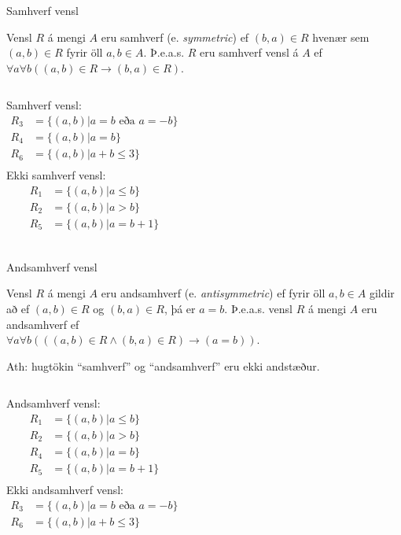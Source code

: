 \documentclass[handout]{beamer}
\begin{document}
\begin{frame}{Samhverf vensl}
\begin{tcolorbox}[title=Samhverf vensl]
Vensl $R$ á mengi $A$ eru samhverf (e. \emph{symmetric}) ef $(b, a) \in R$ hvenær sem $(a,b) \in R$ fyrir öll $a,b \in A$. Þ.e.a.s. $R$ eru samhverf vensl á $A$ ef $\forall a \forall b ((a,b) \in R \to (b, a) \in R)$.
\end{tcolorbox}
\vspace{0.5cm}
\begin{columns}
Samhverf vensl:
\begin{align*}
R_3 &= \{(a, b)|a = b \text{ eða } a = -b\}\\
R_4 &= \{(a, b)|a = b\}\\
R_6 &= \{(a, b)|a+b \leq 3\}\\
\end{align*}
Ekki samhverf vensl:
\begin{align*}
R_1 &= \{(a, b)|a \leq b\}\\
R_2 &= \{(a, b)|a > b\}\\
R_5 &= \{(a, b)|a = b+1\}\\
\end{align*}
\end{columns}
\end{frame}

\begin{frame}[fragile]{Andsamhverf vensl}
\begin{tcolorbox}[title=Andsamhverf vensl]
Vensl $R$ á mengi $A$ eru andsamhverf (e. \emph{antisymmetric}) ef fyrir öll $a, b \in A$ gildir að ef $(a, b) \in R$ og $(b, a) \in R$, þá er $a=b$. Þ.e.a.s. vensl $R$ á mengi $A$ eru andsamhverf ef\\ $\forall a \forall b (((a, b) \in R \land (b, a) \in R) \to (a = b))$.
\end{tcolorbox}
Ath: hugtökin ``samhverf'' og ``andsamhverf'' eru ekki andstæður.
\begin{columns}
Andsamhverf vensl:
\begin{align*}
R_1 &= \{(a, b)|a \leq b\}\\
R_2 &= \{(a, b)|a > b\}\\
R_4 &= \{(a, b)|a = b\}\\
R_5 &= \{(a, b)|a = b+1\}\\
\end{align*}
Ekki andsamhverf vensl:
\begin{align*}
R_3 &= \{(a, b)|a = b \text{ eða } a = -b\}\\
R_6 &= \{(a, b)|a+b \leq 3\}\\
\end{align*}
\end{columns}
\end{frame}
\end{document}
